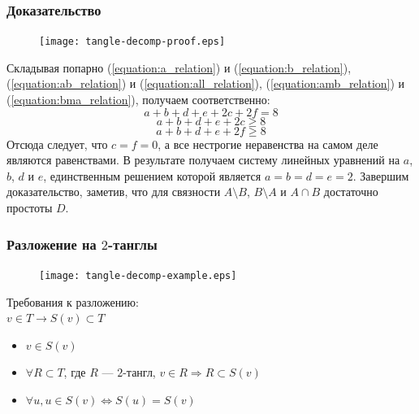 \documentclass[dvips, intlimits, 9pt, unicode, notheorems]{beamer}
\theoremstyle{plain}
\theoremstyle{definition}
\begin{document}
	\begin{frame}
		\frametitle{Доказательство}

		\begin{figure}[H]
			\centering
			\texttt{[image: tangle-decomp-proof.eps]}
		\end{figure}

		Складывая попарно (\ref{equation:a_relation}) и (\ref{equation:b_relation}),
		(\ref{equation:ab_relation}) и (\ref{equation:all_relation}),
		(\ref{equation:amb_relation}) и (\ref{equation:bma_relation}), получаем соответственно:
		\[a + b + d + e + 2c + 2f = 8\]
		\[a + b + d + e + 2c \ge 8\]
		\[a + b + d + e + 2f \ge 8\]
		Отсюда следует, что $c = f = 0$, а все нестрогие неравенства на самом деле являются равенствами. В результате
		получаем систему линейных уравнений на $a$, $b$, $d$ и $e$, единственным решением которой является
		$a = b = d = e = 2$. Завершим доказательство, заметив, что для связности $A\setminus B$, $B\setminus A$ и
		$A\cap B$ достаточно простоты $D$.
	\end{frame}

	\begin{frame}
		\frametitle{Разложение на $2$-танглы}

		\begin{figure}[ht]
			\centering
			\texttt{[image: tangle-decomp-example.eps]}
		\end{figure}

		Требования к разложению: \\
		$v \in T \rightarrow S(v) \subset T$
		\begin{itemize}
			\item $v \in S(v)$
			\item $\forall R \subset T$, где $R$ --- $2$-тангл, $v \in R \Rightarrow R \subset S(v)$
			\item $\forall u, u \in S(v) \Leftrightarrow S(u) = S(v)$
		\end{itemize}
	\end{frame}
\end{document}
